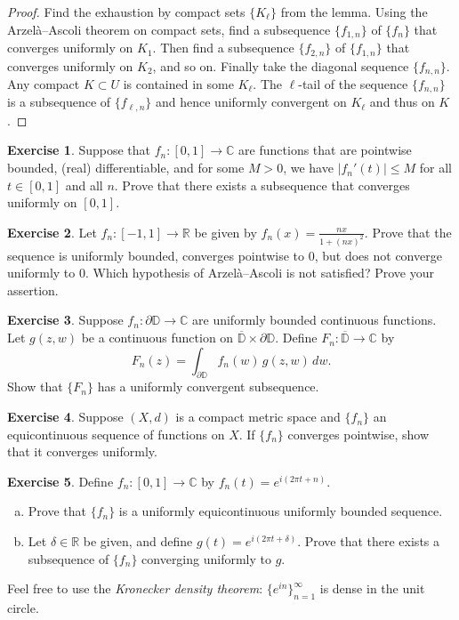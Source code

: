 \documentclass[12pt,openany]{book}
\newcommand{\sabs}[1]{\lvert {#1} \rvert}
\newcommand{\C}{{\mathbb{C}}}
\newcommand{\R}{{\mathbb{R}}}
\newcommand{\D}{{\mathbb{D}}}
\newcommand{\myindex}[1]{#1\index{#1}}
\theoremstyle{plain}
\theoremstyle{remark}
\theoremstyle{definition}
\newenvironment{exbox}{%
    \def\FrameCommand{\vrule width 1pt \relax\hspace{10pt}}%
    \MakeFramed{\advance\hsize-\width\FrameRestore}%
}{%
    \endMakeFramed
}
\newenvironment{exparts}{%
    \leavevmode\begin{enumerate}[a),noitemsep,topsep=0pt,parsep=0pt,partopsep=0pt]
}{%
    \end{enumerate}
}
\theoremstyle{exercise}
\newtheorem{exercise}{Exercise}[section]
\theoremstyle{example}
\begin{document}
\begin{proof}
Find the exhaustion by compact sets $\{ K_\ell \}$ from the lemma.
Using the Arzel\`a--Ascoli theorem on compact sets,
find a subsequence $\{ f_{1,n} \}$  of $\{f_n\}$ that converges uniformly
on $K_1$.  Then find a subsequence
$\{ f_{2,n} \}$ of
$\{ f_{1,n} \}$ that converges uniformly on $K_2$, and so on.
Finally take the diagonal sequence $\{ f_{n,n} \}$.
Any compact $K \subset U$
is contained in some $K_\ell$.  The $\ell$-tail of the sequence $\{ f_{n,n}
\}$ is a subsequence of $\{ f_{\ell,n} \}$ and hence uniformly convergent on
$K_\ell$ and thus on $K$.
\end{proof}

\begin{exbox}
\begin{exercise}
Suppose that $f_n \colon [0,1] \to \C$ are functions that are pointwise
bounded, (real) differentiable, and for some $M> 0$, we have
$\sabs{f_n'(t)} \leq M$ for all $t \in [0,1]$ and all $n$.  Prove that there
exists a subsequence that converges uniformly on $[0,1]$.
\end{exercise}

\begin{exercise}
Let $f_n \colon [-1,1] \to \R$ be given by $f_n(x) = \frac{nx}{1+{(nx)}^2}$.
Prove that the sequence is uniformly bounded, converges pointwise to 0, but
does not converge uniformly to 0.
Which hypothesis of Arzel\`a--Ascoli
is not satisfied?  Prove your assertion.
\end{exercise}

\begin{exercise}
Suppose 
$f_n \colon \partial \D \to \C$ are uniformly bounded continuous functions.
Let $g(z,w)$ be a continuous function on $\overline{\D} \times \partial \D$.
Define
$F_n \colon \overline{\D} \to \C$ by
\begin{equation*}
F_n(z)  = \int_{\partial \D} f_n(w)\, g(z,w) \, dw . 
\end{equation*}
Show that $\{ F_n \}$ has a uniformly convergent subsequence.
\end{exercise}

\begin{exercise}
Suppose $(X,d)$ is a compact metric space and $\{ f_n \}$ an equicontinuous
sequence of functions on $X$.  If $\{ f_n \}$ converges
pointwise, show that it converges uniformly.
\end{exercise}

\begin{exercise}
Define $f_n \colon [0,1] \to \C$ by $f_n(t) = e^{i(2\pi t + n)}$.
\begin{exparts}
\item
Prove that $\{ f_n \}$ is a uniformly equicontinuous
uniformly bounded sequence.
\item
Let $\delta \in \R$ be given, and define $g(t) = e^{i(2\pi t + \delta)}$.
Prove that there exists 
a subsequence of $\{ f_n \}$ converging uniformly to $g$.
\end{exparts}
Feel free to use the \emph{\myindex{Kronecker density theorem}}:
$\{ e^{in} \}_{n=1}^\infty$ is dense in the unit circle.
\end{exercise}
\end{exbox}
\end{document}

